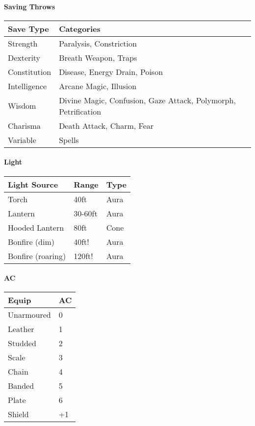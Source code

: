 \paragraph{Saving Throws} 

\begin{tabular}{l l}
Save Type & Categories \\
\hline
Strength & Paralysis, Constriction \\
Dexterity & Breath Weapon, Traps\\
Constitution & Disease, Energy Drain, Poison \\
Intelligence & Arcane Magic, Illusion \\
Wisdom & Divine Magic, Confusion, Gaze Attack, Polymorph, Petrification \\
Charisma & Death Attack, Charm, Fear \\
Variable & Spells \\
\end{tabular}

\begin{multicols}{2}
\paragraph{Light}
\begin{tabular}{l l l}
Light Source & Range & Type \\
\hline
Torch & 40ft & Aura\\
Lantern & 30-60ft & Aura\\
Hooded Lantern & 80ft & Cone\\
Bonfire (dim) & 40ft! & Aura \\
Bonfire (roaring) & 120ft! & Aura \\
\end{tabular}

\paragraph{AC}

\begin{tabular}{l l}
    Equip & AC \\
    \hline
    Unarmoured & 0 \\
    Leather & 1 \\
    Studded & 2 \\
    Scale & 3 \\
    Chain & 4 \\
    Banded & 5 \\
    Plate & 6 \\
    Shield & +1 \\
\end{tabular}
\end{multicols}

